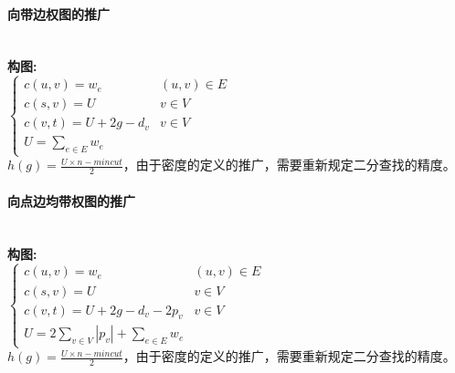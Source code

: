\paragraph{向带边权图的推广}~{}
\\
\textbf{构图:}\\
$
\begin{cases}
c(u, v)=w_e & (u, v) \in E \\
c(s, v)=U & v \in V\\
c(v, t)=U+2g-d_v & v \in V\\
U=\sum_{e \in E}w_e
\end{cases}
$\\
$h(g)=\frac{U \times n - mincut}{2}$，由于密度的定义的推广，需要重新规定二分查找的精度。

\paragraph{向点边均带权图的推广}~{}
\\
\textbf{构图:}\\
$
\begin{cases}
c(u, v)=w_e & (u, v) \in E \\
c(s, v)=U & v \in V\\
c(v, t)=U+2g-d_v-2p_v & v \in V\\
U=2 \sum_{v \in V}|p_v|+\sum_{e \in E}w_e
\end{cases}
$\\
$h(g)=\frac{U \times n - mincut}{2}$，由于密度的定义的推广，需要重新规定二分查找的精度。